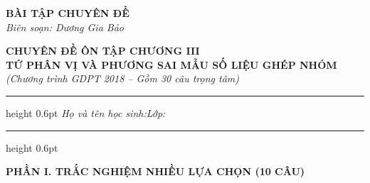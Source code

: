 \documentclass[12pt,a4paper]{article}
\begin{document}
\thispagestyle{firstpage}

\noindent
\begin{minipage}[t]{0.36\textwidth}
    \centering
    {\fontsize{12}{14}\selectfont\textbf{BÀI TẬP CHUYÊN ĐỀ}}\\[4pt]
    \textit{Biên soạn: Dương Gia Bảo}\\[6pt]
    \setlength{\fboxrule}{0.8pt}
    \setlength{\fboxsep}{5pt}
\end{minipage}\hfill
\begin{minipage}[t]{0.62\textwidth}
    \centering
    {\fontsize{13}{15}\selectfont\textbf{CHUYÊN ĐỀ ÔN TẬP CHƯƠNG III}}\\[3pt]
    {\fontsize{12}{14}\selectfont\textbf{TỨ PHÂN VỊ VÀ PHƯƠNG SAI MẪU SỐ LIỆU GHÉP NHÓM}}\\[3pt]
    {\fontsize{11}{13}\selectfont\textit{(Chương trình GDPT 2018 -- Gồm 30 câu trọng tâm)}}
\end{minipage}

\par\vspace{4pt}
\hrule height 0.6pt
\vspace{4pt}
\noindent\textit{Họ và tên học sinh:}\dotfill\hspace{0.8cm}\textit{Lớp:}\makebox[3.2cm]{\dotfill}
\par\vspace{3pt}
\hrule height 0.6pt
\vspace{6pt}

\begin{center}
    {\fontsize{13}{15}\selectfont\textbf{PHẦN I. TRẮC NGHIỆM NHIỀU LỰA CHỌN (10 CÂU)}}
\end{center}
\end{document}
